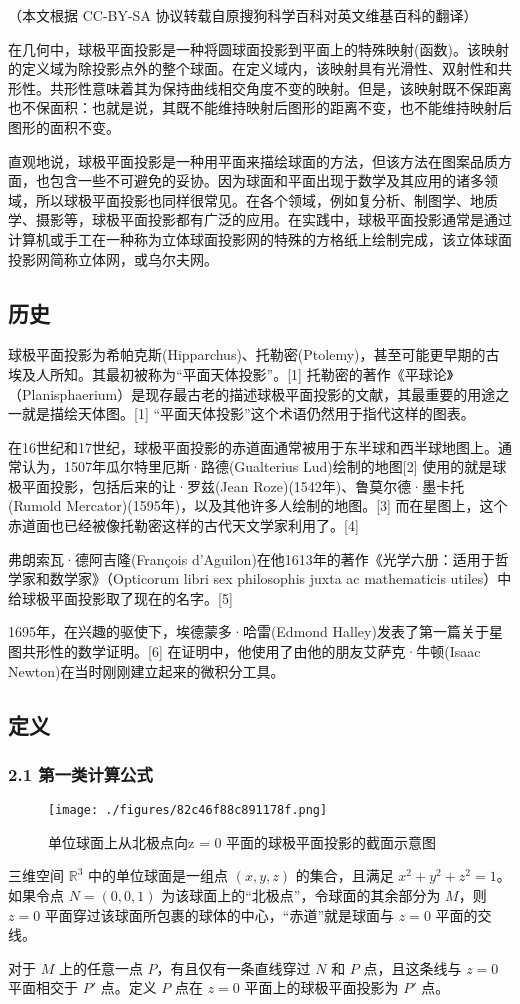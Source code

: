 
（本文根据 CC-BY-SA 协议转载自原搜狗科学百科对英文维基百科的翻译）

在几何中，球极平面投影是一种将圆球面投影到平面上的特殊映射(函数)。该映射的定义域为除投影点外的整个球面。在定义域内，该映射具有光滑性、双射性和共形性。共形性意味着其为保持曲线相交角度不变的映射。但是，该映射既不保距离也不保面积：也就是说，其既不能维持映射后图形的距离不变，也不能维持映射后图形的面积不变。

直观地说，球极平面投影是一种用平面来描绘球面的方法，但该方法在图案品质方面，也包含一些不可避免的妥协。因为球面和平面出现于数学及其应用的诸多领域，所以球极平面投影也同样很常见。在各个领域，例如复分析、制图学、地质学、摄影等，球极平面投影都有广泛的应用。在实践中，球极平面投影通常是通过计算机或手工在一种称为立体球面投影网的特殊的方格纸上绘制完成，该立体球面投影网简称立体网，或乌尔夫网。

\subsection{历史}
球极平面投影为希帕克斯(Hipparchus)、托勒密(Ptolemy)，甚至可能更早期的古埃及人所知。其最初被称为“平面天体投影”。[1] 托勒密的著作《平球论》（Planisphaerium）是现存最古老的描述球极平面投影的文献，其最重要的用途之一就是描绘天体图。[1] “平面天体投影”这个术语仍然用于指代这样的图表。

在16世纪和17世纪，球极平面投影的赤道面通常被用于东半球和西半球地图上。通常认为，1507年瓜尔特里厄斯·路德(Gualterius Lud)绘制的地图[2] 使用的就是球极平面投影，包括后来的让·罗兹(Jean Roze)(1542年)、鲁莫尔德·墨卡托(Rumold Mercator)(1595年)，以及其他许多人绘制的地图。[3] 而在星图上，这个赤道面也已经被像托勒密这样的古代天文学家利用了。[4]

弗朗索瓦·德阿吉隆(François d'Aguilon)在他1613年的著作《光学六册：适用于哲学家和数学家》（Opticorum libri sex philosophis juxta ac mathematicis utiles）中给球极平面投影取了现在的名字。[5]

1695年，在兴趣的驱使下，埃德蒙多·哈雷(Edmond Halley)发表了第一篇关于星图共形性的数学证明。[6] 在证明中，他使用了由他的朋友艾萨克·牛顿(Isaac Newton)在当时刚刚建立起来的微积分工具。

\subsection{定义}
\subsubsection{2.1 第一类计算公式}
\begin{figure}[ht]
\centering
\texttt{[image: ./figures/82c46f88c891178f.png]}
\caption{单位球面上从北极点向z = 0 平面的球极平面投影的截面示意图} \label{fig_QJPMTY_1}
\end{figure}
三维空间 $\mathbb{R}^3$ 中的单位球面是一组点 $(x, y, z)$ 的集合，且满足 $x^2 + y^2 + z^2 = 1$。如果令点 $N = (0, 0, 1)$ 为该球面上的“北极点”，令球面的其余部分为 $M$，则 $z = 0$ 平面穿过该球面所包裹的球体的中心，“赤道”就是球面与 $z = 0$ 平面的交线。

对于 $M$ 上的任意一点 $P$，有且仅有一条直线穿过 $N$ 和 $P$ 点，且这条线与 $z = 0$ 平面相交于 $P'$ 点。定义 $P$ 点在 $z = 0$ 平面上的球极平面投影为 $P'$ 点。

